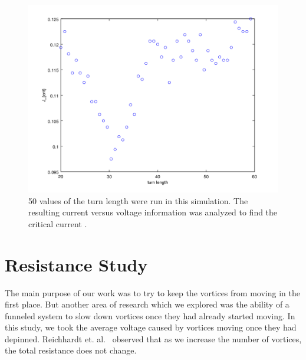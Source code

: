 \begin{figure}[htbp]
\begin{center}
\includegraphics[scale=.50]{kinkScan.png}
\caption{ 50 values of the turn length were run in this simulation. The resulting current versus voltage information was analyzed to find the critical current .  }
\label{kinkScan}
\end{center}
\end{figure}

\section{Resistance Study}
The main purpose of our work was to try to keep the vortices from moving in the first place. But another area of research which we explored was the ability of a funneled system to slow down vortices once they had already started moving. In this study, we took the average voltage caused by vortices moving once they had depinned. Reichhardt et. al.~\cite{Reichhardt10} observed that as we increase the number of vortices, the total resistance does not change.

